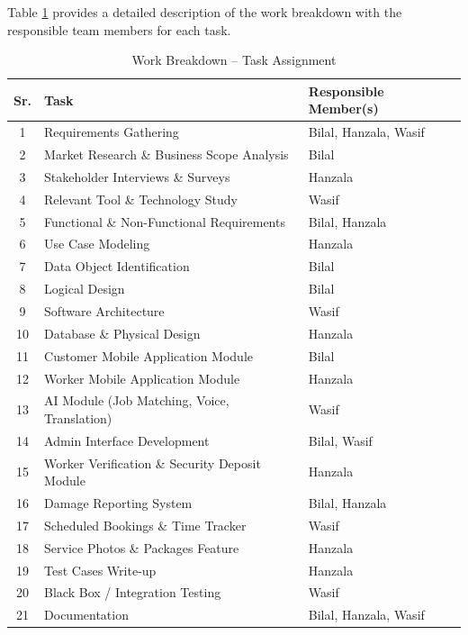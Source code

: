 \documentclass[12pt,a4paper]{report}
\begin{document}
Table \ref{tab:wbs} provides a detailed description of the work breakdown with the responsible team members for each task.

\begin{table}[!htbp]
    \centering
    \caption{Work Breakdown -- Task Assignment}
    \label{tab:wbs}
    \vspace{0.2cm}
    \begin{tabular}{cp{7cm}l}
        \toprule
        \textbf{Sr.} & \textbf{Task} & \textbf{Responsible Member(s)} \\
        \midrule
        1 & Requirements Gathering & Bilal, Hanzala, Wasif \\
        2 & Market Research \& Business Scope Analysis & Bilal \\
        3 & Stakeholder Interviews \& Surveys & Hanzala \\
        4 & Relevant Tool \& Technology Study & Wasif \\
        5 & Functional \& Non-Functional Requirements & Bilal, Hanzala \\
        6 & Use Case Modeling & Hanzala \\
        7 & Data Object Identification & Bilal \\
        8 & Logical Design & Bilal \\
        9 & Software Architecture & Wasif \\
        10 & Database \& Physical Design & Hanzala \\
        11 & Customer Mobile Application Module & Bilal \\
        12 & Worker Mobile Application Module & Hanzala \\
        13 & AI Module (Job Matching, Voice, Translation) & Wasif \\
        14 & Admin Interface Development & Bilal, Wasif \\
        15 & Worker Verification \& Security Deposit Module & Hanzala \\
        16 & Damage Reporting System & Bilal, Hanzala \\
        17 & Scheduled Bookings \& Time Tracker & Wasif \\
        18 & Service Photos \& Packages Feature & Hanzala \\
        19 & Test Cases Write-up & Hanzala \\
        20 & Black Box / Integration Testing & Wasif \\
        21 & Documentation & Bilal, Hanzala, Wasif \\
        \bottomrule
    \end{tabular}
\end{table}
\end{document}
